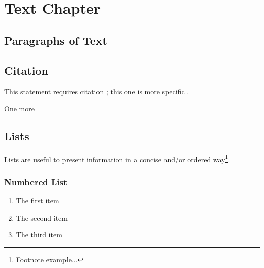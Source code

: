 \documentclass[11pt,fleqn]{book} %
\begin{document}
\pagestyle{empty} %

\tableofcontents %

\cleardoublepage %

\pagestyle{fancy} %



\chapter{Text Chapter}

\section{Paragraphs of Text}

\lipsum[1-7] %


\section{Citation}

This statement requires citation \cite{book_key}; this one is more specific \cite[122]{article_key}.

One more \cite[23]{hawking1975particle}


\section{Lists}

Lists are useful to present information in a concise and/or ordered way\footnote{Footnote example...}.

\subsection{Numbered List}

\begin{enumerate}
\item The first item
\item The second item
\item The third item
\end{enumerate}
\end{document}
